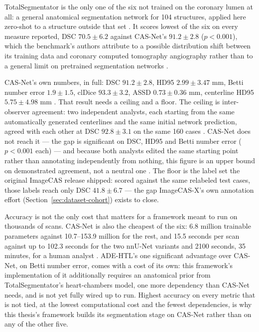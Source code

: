 TotalSegmentator is the only one of the six not trained on the coronary lumen at all: a general
anatomical segmentation network for 104 structures, applied here zero-shot to a structure outside
that set \cite{wasserthal2023totalsegmentator}.
It scores lowest of the six on every measure reported, DSC $70.5 \pm 6.2$ against CAS-Net's
$91.2 \pm 2.8$ ($p<0.001$), which the benchmark's authors attribute to a possible distribution
shift between its training data and coronary computed tomography angiography rather than to a
general limit on pretrained segmentation networks \cite{bransby2026imagecasx}.

CAS-Net's own numbers, in full: DSC $91.2 \pm 2.8$, HD95 $2.99 \pm 3.47$ mm, Betti number error
$1.9 \pm 1.5$, clDice $93.3 \pm 3.2$, ASSD $0.73 \pm 0.36$ mm, centerline HD95
$5.75 \pm 4.98$ mm \cite{bransby2026imagecasx,dong2023casnet}.
That result needs a ceiling and a floor.
The ceiling is inter-observer agreement: two independent analysts, each starting from the same
automatically generated centerlines and the same initial network prediction, agreed with each
other at DSC $92.8 \pm 3.1$ on the same 160 cases \cite{bransby2026imagecasx}.
CAS-Net does not reach it — the gap is significant on DSC, HD95 and Betti number error
($p<0.001$ each) — and because both analysts edited the same starting point rather than annotating
independently from nothing, this figure is an upper bound on demonstrated agreement, not a neutral
one \cite{bransby2026imagecasx}.
The floor is the label set the original ImageCAS release shipped: scored against the same
relabeled test cases, those labels reach only DSC $41.8 \pm 6.7$
\cite{bransby2026imagecasx,zeng2023imagecas} --- the gap ImageCAS-X's own annotation effort
(Section~\ref{sec:dataset-cohort}) exists to close.

Accuracy is not the only cost that matters for a framework meant to run on thousands of scans.
CAS-Net is also the cheapest of the six: 6.8 million trainable parameters against 10.7--153.9
million for the rest, and 15.5 seconds per scan against up to 102.3 seconds for the two nnU-Net
variants and 2100 seconds, 35 minutes, for a human analyst \cite{bransby2026imagecasx}.
ADE-HTL's one significant advantage over CAS-Net, on Betti number error, comes with a cost of its
own: this framework's implementation of it additionally requires an anatomical prior from
TotalSegmentator's heart-chambers model, one more dependency than CAS-Net needs, and is not yet
fully wired up to run.
Highest accuracy on every metric that is not tied, at the lowest computational cost and the fewest
dependencies, is why this thesis's framework builds its segmentation stage on CAS-Net rather than
on any of the other five.
